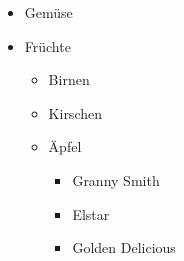 \documentclass[varwidth]{standalone}
\begin{document}
\begin{itemize}
	\item Gemüse
	\item Früchte
	\begin{itemize}
		\item Birnen
		\item Kirschen
		\item Äpfel
		\begin{itemize}
			\item Granny Smith
			\item Elstar
			\item Golden Delicious
		\end{itemize}
	\end{itemize}
\end{itemize}
\end{document}
